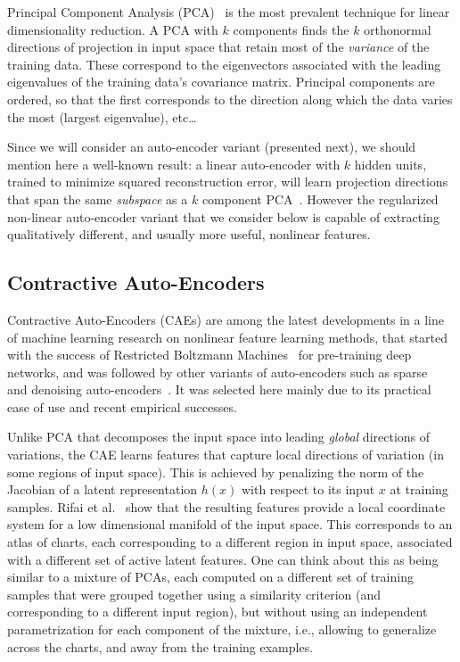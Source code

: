 \documentclass[runningheads,a4paper]{llncs}
\begin{document}
Principal Component Analysis (PCA)~\cite{Pearson-1901,Hotelling1933} 
is the most prevalent technique for
linear dimensionality reduction. A PCA with $k$ components finds the $k$
orthonormal directions of projection in input space that retain most of the
\textit{variance} of the training data. These correspond to the eigenvectors
associated with the leading eigenvalues of the training data's covariance
matrix. Principal components are
ordered, so that the first corresponds to the direction along which the data varies the
most (largest eigenvalue), etc\ldots 

Since we will consider an auto-encoder variant (presented next),
we should mention here a well-known result: a linear auto-encoder with $k$
hidden units, trained to minimize squared reconstruction error, will learn
projection directions that span the same \textit{subspace} as a $k$ component
PCA~\cite{Baldi89}.  However the regularized non-linear auto-encoder variant
that we consider below is capable of extracting qualitatively different, and
usually more useful, nonlinear features.

\subsection{Contractive Auto-Encoders}

Contractive Auto-Encoders (CAEs) \cite{Rifai+al-2011} are among
the latest developments in a line of machine learning research on nonlinear
feature learning methods, that started with the success of Restricted Boltzmann
Machines~\cite{Hinton06} for pre-training deep networks, and was followed by
other variants of auto-encoders such as
sparse~\cite{ranzato-07-small,Koray-08,Goodfellow2009} and  denoising
auto-encoders~\cite{VincentPLarochelleH2008}.
It was selected here mainly due to its practical ease of use and recent
empirical successes.

Unlike PCA that decomposes the input space into leading {\em global} directions
of variations, the CAE learns features that capture local directions of
variation (in some regions of input space). This is achieved by penalizing the
norm of the Jacobian of a latent representation $h(x)$ with respect to its
input $x$ at training samples. Rifai et al.~\cite{Rifai+al-2011} show that the
resulting features provide a local coordinate system for a low dimensional
manifold of the input space. This corresponds to an atlas of charts, each
corresponding to a different region in input space, associated with a different
set of active latent features. One can think about this as being similar to a
mixture of PCAs, each computed on a different set of training samples that were
grouped together using a similarity criterion (and corresponding to a different
input region), but without using an independent parametrization for each
component of the mixture, i.e., allowing to generalize across the charts, and
away from the training examples.
\end{document}
